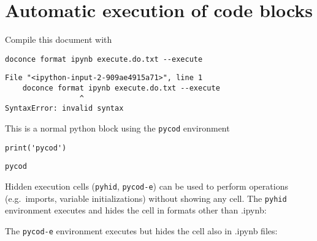 \documentclass[%
oneside,                 %
final,                   %
chapterprefix=true,      %
open=right,              %
10pt]{book}
\begin{document}

\newcommand{\exercisesection}[1]{\subsection*{#1}}





\chapter{Automatic execution of code blocks}


Compile this document with

\begin{Verbatim}[numbers=none,fontsize=\fontsize{9pt}{9pt},baselinestretch=0.95]
doconce format ipynb execute.do.txt --execute
\end{Verbatim}
\begin{Verbatim}[numbers=none,fontsize=\fontsize{9pt}{9pt},baselinestretch=0.95]
  File "<ipython-input-2-909ae4915a71>", line 1
    doconce format ipynb execute.do.txt --execute
                 ^
SyntaxError: invalid syntax
\end{Verbatim}

This is a normal python block using the \texttt{pycod} environment
\begin{Verbatim}[numbers=none,fontsize=\fontsize{9pt}{9pt},baselinestretch=0.95]
print('pycod')
\end{Verbatim}
\begin{Verbatim}[numbers=none,fontsize=\fontsize{9pt}{9pt},baselinestretch=0.95]
pycod
\end{Verbatim}

Hidden execution cells (\texttt{pyhid}, \texttt{pycod-e}) can be used to perform operations (e.g.~imports, variable initializations) without showing any cell.  
The \texttt{pyhid} environment executes and hides the cell in formats other than .ipynb:



The \texttt{pycod-e} environment executes but hides the cell also in .ipynb files:
\end{document}
